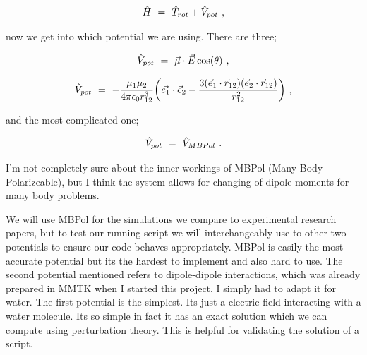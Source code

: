 \documentclass{article}
\begin{document}
\begin{equation} \label{eq:3}
\hat{H} \hspace{0.125cm} = \hspace{0.125cm} \hat{T}_{rot} + \hat{V}_{pot} \hspace{0.125cm} ,
\end{equation}

now we get into which potential we are using. There are three;

\begin{equation} \label{eq:3}
\hat{V}_{pot} \hspace{0.125cm} = \hspace{0.125cm} \vec{\mu} \cdot \vec{E} \cos(\theta) \hspace{0.125cm} ,
\end{equation}

\begin{equation} \label{eq:3}
\hat{V}_{pot} \hspace{0.125cm} = \hspace{0.125cm} - \frac{\mu_{1} \mu_{2}}{4 \pi \epsilon_{0} r_{1 2}^{3}} \bigg( \vec{e_1} \cdot \vec{e}_{2} - \frac{3(\vec{e}_{1} \cdot \vec{r}_{1 2})( \vec{e}_{2} \cdot \vec{r}_{1 2})}{r_{1 2}^{2}} \bigg) \hspace{0.125cm} ,
\end{equation}

and the most complicated one;

\begin{equation} \label{eq:3}
\hat{V}_{pot} \hspace{0.125cm} = \hspace{0.125cm} \hat{V}_{MBPol}  \hspace{0.125cm} .
\end{equation}

I'm not completely sure about the inner workings of MBPol (Many Body Polarizeable), but I think the system allows for changing of dipole moments for many body problems.

We will use MBPol for the simulations we compare to experimental research papers, but to test our running script we will interchangeably use to other two potentials to ensure our code behaves appropriately. MBPol is easily the most accurate potential but its the hardest to implement and also hard to use. The second potential mentioned refers to dipole-dipole interactions, which was already prepared in MMTK when I started this project. I simply had to adapt it for water. The first potential is the simplest. Its just a electric field interacting with a water molecule. Its so simple in fact it has an exact solution which we can compute using perturbation theory. This is helpful for validating the solution of a script. 
\end{document}
